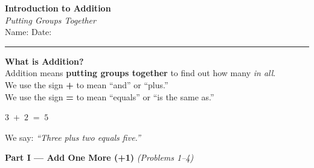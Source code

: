\documentclass[12pt, letterpaper]{article}
\newcommand{\answerline}{\underline{\hspace{2.5cm}}}
\newcommand{\biganswerline}{\underline{\hspace{4cm}}}
\begin{document}
\begin{center}
  {\LARGE\textbf{\textcolor{scholared}{Introduction to Addition}}}\\[4pt]
  {\Large\textcolor{scholagold}{\textit{Putting Groups Together}}}\\[6pt]
  {\small Name: \biganswerline \hspace{1cm} Date: \answerline}
\end{center}

\vspace{4pt}
\noindent\textcolor{scholared}{\rule{\linewidth}{1pt}}
\vspace{4pt}


\begin{lessonbox}
\textbf{What is Addition?}\\[4pt]
Addition means \textbf{putting groups together} to find out how many \textit{in all}.\\[6pt]
We use the sign \textbf{+} to mean ``and'' or ``plus.''\\
We use the sign \textbf{=} to mean ``equals'' or ``is the same as.''\\[8pt]
\begin{center}
\end{center}
\begin{center}
  \Large $3 \;+\; 2 \;=\; 5$
\end{center}
\medskip
\noindent We say: \textit{``Three plus two equals five.''}
\end{lessonbox}

\bigskip

\noindent\textcolor{scholared}{\large\textbf{Part I — Add One More (+1)}} \hfill \textit{(Problems 1–4)}
\end{document}
